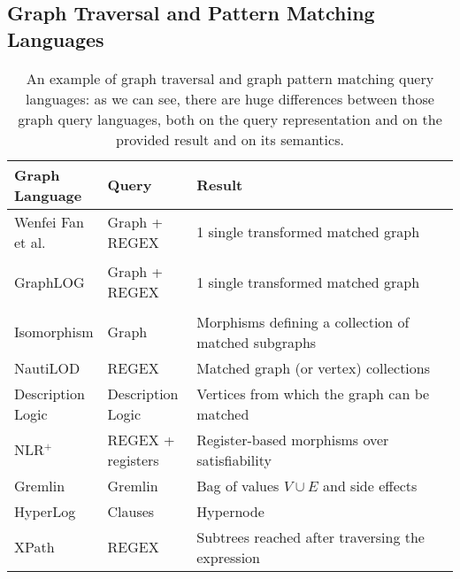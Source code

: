 

\subsection{Graph Traversal and Pattern Matching Languages}\label{sec:gtl}
\begin{table}
	\centering
\hspace*{-1cm}
\begin{tabularx}{\textwidth}{m{0.2\linewidth}|m{0.2\linewidth}|m{0.7\linewidth}}
	\toprule
	Graph Language & Query & Result \\
	\midrule
	Wenfei Fan et al. \cite{n3} & Graph + REGEX & 1 single transformed matched graph\\\hline
	GraphLOG \par \cite{consens1990a,GraphLogAggr} & Graph + REGEX & 1 single transformed matched graph\\\hline
	Isomorphism & Graph & Morphisms defining a collection of matched sub\-graphs\\\hline
	NautiLOD \cite{NautiLOD} & REGEX & Matched graph (or vertex) collections\\\hline
	Description Logic \cite{BotoevaCCRX16, Baader2010} & Description Logic & Vertices from which the graph can be matched\\\hline
	NLR$^+$ \cite{Barcelo2013} & REGEX + registers & Register-based morphisms over satisfiability \\\hline
	Gremlin \cite{Rodriguez15} & Gremlin & Bag of values $V\cup E$ and side effects\\\hline
	HyperLog \cite{poulovassilis2001} & Clauses & Hypernode\\\hline
	XPath \cite{xpath31} & REGEX & Subtrees reached after traversing the expression\\
	\bottomrule
\end{tabularx}
\caption{An example of graph traversal and graph pattern matching query languages: as we can see, there are huge differences between those graph query languages, both on the query representation and on the provided result and on its semantics.}
\label{tab:messedtables}
\end{table}

